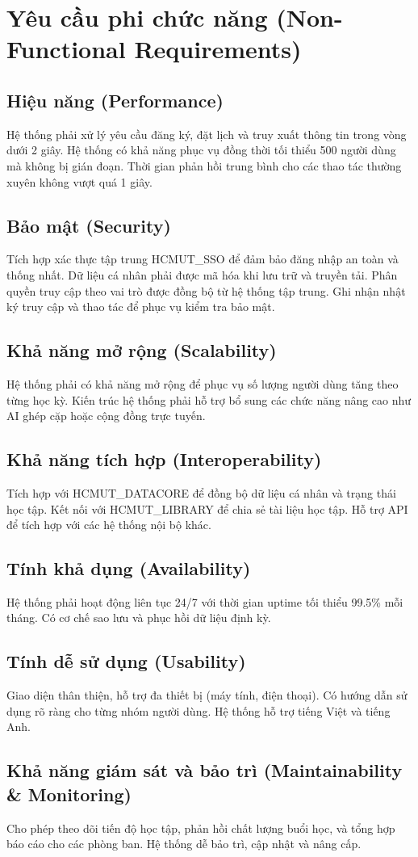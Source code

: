 \section{Yêu cầu phi chức năng (Non-Functional Requirements)}

\subsection{Hiệu năng (Performance)}
Hệ thống phải xử lý yêu cầu đăng ký, đặt lịch và truy xuất thông tin trong vòng dưới 2 giây.  
Hệ thống có khả năng phục vụ đồng thời tối thiểu 500 người dùng mà không bị gián đoạn.  
Thời gian phản hồi trung bình cho các thao tác thường xuyên không vượt quá 1 giây.

\subsection{Bảo mật (Security)}
Tích hợp xác thực tập trung HCMUT\_SSO để đảm bảo đăng nhập an toàn và thống nhất.  
Dữ liệu cá nhân phải được mã hóa khi lưu trữ và truyền tải.  
Phân quyền truy cập theo vai trò được đồng bộ từ hệ thống tập trung.  
Ghi nhận nhật ký truy cập và thao tác để phục vụ kiểm tra bảo mật.

\subsection{Khả năng mở rộng (Scalability)}
Hệ thống phải có khả năng mở rộng để phục vụ số lượng người dùng tăng theo từng học kỳ.  
Kiến trúc hệ thống phải hỗ trợ bổ sung các chức năng nâng cao như AI ghép cặp hoặc cộng đồng trực tuyến.

\subsection{Khả năng tích hợp (Interoperability)}
Tích hợp với HCMUT\_DATACORE để đồng bộ dữ liệu cá nhân và trạng thái học tập.  
Kết nối với HCMUT\_LIBRARY để chia sẻ tài liệu học tập.  
Hỗ trợ API để tích hợp với các hệ thống nội bộ khác.

\subsection{Tính khả dụng (Availability)}
Hệ thống phải hoạt động liên tục 24/7 với thời gian uptime tối thiểu 99.5\% mỗi tháng.  
Có cơ chế sao lưu và phục hồi dữ liệu định kỳ.

\subsection{Tính dễ sử dụng (Usability)}
Giao diện thân thiện, hỗ trợ đa thiết bị (máy tính, điện thoại).  
Có hướng dẫn sử dụng rõ ràng cho từng nhóm người dùng.  
Hệ thống hỗ trợ tiếng Việt và tiếng Anh.

\subsection{Khả năng giám sát và bảo trì (Maintainability \& Monitoring)}
Cho phép theo dõi tiến độ học tập, phản hồi chất lượng buổi học, và tổng hợp báo cáo cho các phòng ban.  
Hệ thống dễ bảo trì, cập nhật và nâng cấp.